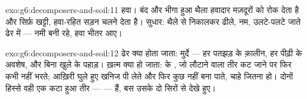 \begin{solution}{exo:g6:decomposers-and-soil:11}
हवा। बंद और भीगा हुआ थैला हवादार मज़दूरों को रोक देता है और सिर्फ़
खट्टी, हवा-रहित सड़न चलने देता है। सुधार: थैले से निकालकर ढीले, नम,
उलटे-पलटे जाते ढेर में --- नमी बनी रहे, हवा भीतर आए।
\end{solution}

\begin{solution}{exo:g6:decomposers-and-soil:12}
ढेर क्या होता जाता: मुर्दे --- हर पतझड़ के क़ालीन, हर पीढ़ी के अवशेष,
और बिना खुले  के पहाड़। ख़त्म क्या हो जाता:  के
, जो लौटाने वाला तीर कट जाने पर फिर कभी नहीं भरते; 
आख़िरी घुले हुए खनिज पी लेते और फिर कुछ नहीं बना पाते,  चाहे
जितना हो। दोनों हिस्से वही एक कटा हुआ तीर ---  --- हैं, बस उसके
दो सिरों से देखे हुए।
\end{solution}

